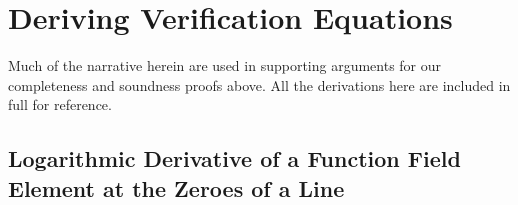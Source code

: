 \documentclass[11pt,letterpaper]{article}
\theoremstyle{definition}
\newcommand{\6}{\mathbf}
\newcommand{\7}{\mathcal}
\begin{document}
         




















\appendix

\section{Deriving Verification Equations}\label{sec:derivation}

Much of the narrative herein are used in supporting arguments for our completeness and soundness proofs above. All the derivations here are included in full for reference. 

\subsection{Logarithmic Derivative of a Function Field Element at the Zeroes of a Line}
\label{AppendixOne}

\end{document}
